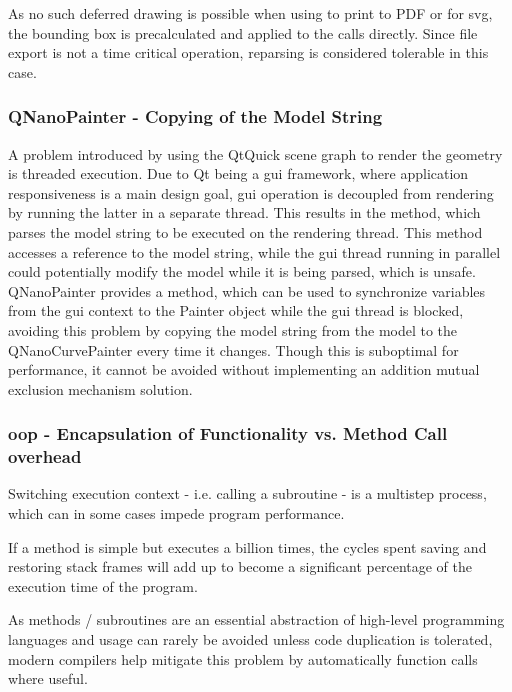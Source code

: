 As no such deferred drawing is possible when using  to print to PDF or  for \gls{svg}, the bounding box is precalculated and applied to the calls directly. Since file export is not a time critical operation, reparsing is considered tolerable in this case.

\subsubsection{QNanoPainter - Copying of the Model String}
A problem introduced by using the QtQuick scene graph to render the geometry is threaded execution. Due to Qt being a \gls{gui} framework, where application responsiveness is a main design goal, \gls{gui} operation is decoupled from rendering by running the latter in a separate thread. This results in the  method, which parses the model string to be executed on the rendering thread. This method accesses a reference to the model string, while the \gls{gui} thread running in parallel could potentially modify the model while it is being parsed, which is unsafe. QNanoPainter provides a  method, which can be used to synchronize variables from the \gls{gui} context to the Painter object while the \gls{gui} thread is blocked, avoiding this problem by copying the model string from the model to the QNanoCurvePainter every time it changes. Though this is suboptimal for performance, it cannot be avoided without implementing an addition mutual exclusion mechanism solution.

\subsubsection{\gls{oop} - Encapsulation of Functionality vs. Method Call overhead}

Switching execution context - i.e. calling a subroutine - is a multistep process, which can in some cases impede program performance.

If a method is simple but executes a billion times, the cycles spent saving and restoring stack frames will add up to become a significant percentage of the execution time of the program.

As methods / subroutines are an essential abstraction of high-level programming languages and usage can rarely be avoided unless code duplication is tolerated, modern compilers help mitigate this problem by automatically  function calls where useful.

